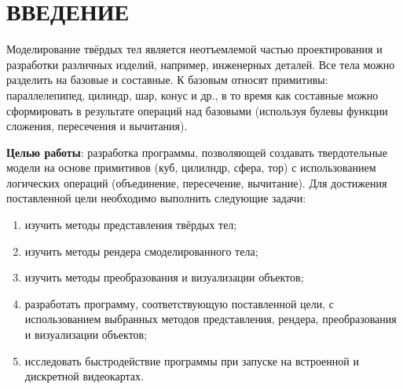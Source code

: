 \section*{ВВЕДЕНИЕ}

Моделирование твёрдых тел является неотъемлемой частью проектирования и разработки различных изделий, например, инженерных деталей. 
Все тела можно разделить на базовые и составные. 
К базовым относят примитивы: параллелепипед, цилиндр, шар, конус и др., в то время как составные можно сформировать в результате операций над базовыми (используя булевы функции сложения, пересечения и вычитания). 

\textbf{Целью работы}: разработка программы, позволяющей создавать твердотельные модели на основе примитивов (куб, цилилндр, сфера, тор) с использованием логических операций (объединение, пересечение, вычитание).
Для достижения поставленной цели необходимо выполнить следующие задачи:
\begin{enumerate}[label=\arabic*)]
	\item изучить методы представления твёрдых тел;
	\item изучить методы рендера смоделированного тела;
	\item изучить методы преобразования и визуализации объектов;
	\item разработать программу, соответствующую поставленной цели, с использованием выбранных методов представления, рендера, преобразования и визуализации объектов;
	\item исследовать быстродействие программы при запуске на встроенной и дискретной видеокартах.
\end{enumerate}

